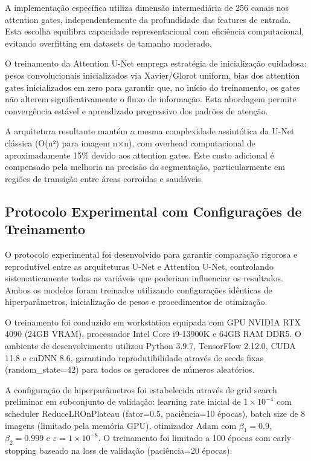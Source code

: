 \documentclass[12pt,a4paper,twoside]{article}
\begin{document}
A implementação específica utiliza dimensão intermediária de 256 canais nos attention gates, independentemente da profundidade das features de entrada. Esta escolha equilibra capacidade representacional com eficiência computacional, evitando overfitting em datasets de tamanho moderado.

O treinamento da Attention U-Net emprega estratégia de inicialização cuidadosa: pesos convolucionais inicializados via Xavier/Glorot uniform, bias dos attention gates inicializados em zero para garantir que, no início do treinamento, os gates não alterem significativamente o fluxo de informação. Esta abordagem permite convergência estável e aprendizado progressivo dos padrões de atenção.

A arquitetura resultante mantém a mesma complexidade assintótica da U-Net clássica (O(n²) para imagem n×n), com overhead computacional de aproximadamente 15\% devido aos attention gates. Este custo adicional é compensado pela melhoria na precisão da segmentação, particularmente em regiões de transição entre áreas corroídas e saudáveis.

\subsection{Protocolo Experimental com Configurações de Treinamento}
\label{subsec:protocolo_experimental}

O protocolo experimental foi desenvolvido para garantir comparação rigorosa e reprodutível entre as arquiteturas U-Net e Attention U-Net, controlando sistematicamente todas as variáveis que poderiam influenciar os resultados. Ambos os modelos foram treinados utilizando configurações idênticas de hiperparâmetros, inicialização de pesos e procedimentos de otimização.

O treinamento foi conduzido em workstation equipada com GPU NVIDIA RTX 4090 (24GB VRAM), processador Intel Core i9-13900K e 64GB RAM DDR5. O ambiente de desenvolvimento utilizou Python 3.9.7, TensorFlow 2.12.0, CUDA 11.8 e cuDNN 8.6, garantindo reprodutibilidade através de seeds fixas (random\_state=42) para todos os geradores de números aleatórios.

A configuração de hiperparâmetros foi estabelecida através de grid search preliminar em subconjunto de validação: learning rate inicial de $1 \times 10^{-4}$ com scheduler ReduceLROnPlateau (fator=0.5, paciência=10 épocas), batch size de 8 imagens (limitado pela memória GPU), otimizador Adam com $\beta_1=0.9$, $\beta_2=0.999$ e $\varepsilon=1 \times 10^{-8}$. O treinamento foi limitado a 100 épocas com early stopping baseado na loss de validação (paciência=20 épocas).
\end{document}
